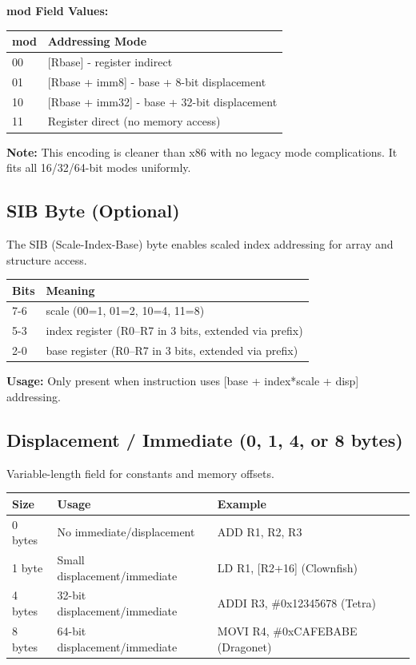 \documentclass[12pt]{article}
\begin{document}
\textbf{mod Field Values:}

\begin{table}[h]
\centering
\begin{tabular}{@{}ll@{}}
\toprule
\textbf{mod} & \textbf{Addressing Mode} \\ \midrule
00 & [Rbase] - register indirect \\
01 & [Rbase + imm8] - base + 8-bit displacement \\
10 & [Rbase + imm32] - base + 32-bit displacement \\
11 & Register direct (no memory access) \\ \bottomrule
\end{tabular}
\end{table}

\textbf{Note:} This encoding is cleaner than x86 with no legacy mode complications. It fits all 16/32/64-bit modes uniformly.

\subsection{SIB Byte (Optional)}

The SIB (Scale-Index-Base) byte enables scaled index addressing for array and structure access.

\begin{table}[h]
\centering
\begin{tabular}{@{}ll@{}}
\toprule
\textbf{Bits} & \textbf{Meaning} \\ \midrule
7-6 & scale (00=1, 01=2, 10=4, 11=8) \\
5-3 & index register (R0--R7 in 3 bits, extended via prefix) \\
2-0 & base register (R0--R7 in 3 bits, extended via prefix) \\ \bottomrule
\end{tabular}
\end{table}

\textbf{Usage:} Only present when instruction uses [base + index*scale + disp] addressing.

\subsection{Displacement / Immediate (0, 1, 4, or 8 bytes)}

Variable-length field for constants and memory offsets.

\begin{table}[h]
\centering
\begin{tabular}{@{}lll@{}}
\toprule
\textbf{Size} & \textbf{Usage} & \textbf{Example} \\ \midrule
0 bytes & No immediate/displacement & ADD R1, R2, R3 \\
1 byte & Small displacement/immediate & LD R1, [R2+16] (Clownfish) \\
4 bytes & 32-bit displacement/immediate & ADDI R3, \#0x12345678 (Tetra) \\
8 bytes & 64-bit displacement/immediate & MOVI R4, \#0xCAFEBABE (Dragonet) \\ \bottomrule
\end{tabular}
\end{table}
\end{document}
